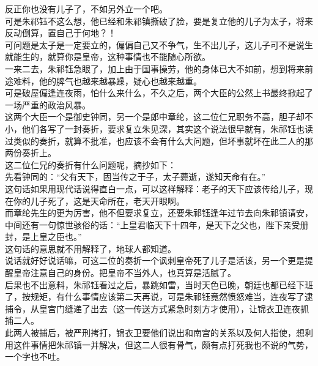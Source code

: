 \begin{multicols}{\theparacolNo}
反正你也没有儿子了，不如另外立一个吧。\\

可是朱祁钰不这么想，他已经和朱祁镇撕破了脸，要是复立他的儿子为太子，将来反动倒算，置自己于何地？！\\

可问题是太子是一定要立的，偏偏自己又不争气，生不出儿子，这儿子可不是说生就能生的，就算你是皇帝，这种事情也不能随心所欲。\\

一来二去，朱祁钰急眼了，加上由于国事操劳，他的身体已大不如前，想到将来前途难料，他的脾气也越来越暴躁，疑心也越来越重。\\

可是破屋偏逢连夜雨，怕什么来什么，不久之后，两个大臣的公然上书最终掀起了一场严重的政治风暴。\\

这两个大臣一个是御史钟同，另一个是郎中章纶，这二位仁兄职务不高，胆子却不小，他们各写了一封奏折，要求复立朱见深，其实这个说法很早就有，朱祁钰也读过类似的奏折，就算不批准，也应该不会有什么大问题，但坏事就坏在此二人的那两份奏折上。\\

这二位仁兄的奏折有什么问题呢，摘抄如下：\\

先看钟同的：“父有天下，固当传之于子，太子薨逝，遂知天命有在。”\\

这句话如果用现代话说得直白一点，可以这样解释：老子的天下应该传给儿子，现在你的儿子死了，这是天命所在，老天开眼啊。\\

而章纶先生的更为厉害，他不但要求复立，还要朱祁钰逢年过节去向朱祁镇请安，中间还有一句惊世骇俗的话：“上皇君临天下十四年，是天下之父也，陛下亲受册封，是上皇之臣也。”\\

这句话的意思就不用解释了，地球人都知道。\\

说话就好好说话嘛，可这二位的奏折一个讽刺皇帝死了儿子是活该，另一个更是提醒皇帝注意自己的身份。把皇帝不当外人，也真算是活腻了。\\

后果也不出意料，朱祁钰看过之后，暴跳如雷，当时天色已晚，朝廷也都已经下班了，按规矩，有什么事情应该第二天再说，可是朱祁钰竟然愤怒难当，连夜写了逮捕令，从皇宫门缝递了出去（这一传送方式紧急时刻方才使用），让锦衣卫连夜抓捕二人。\\

此两人被捕后，被严刑拷打，锦衣卫要他们说出和南宫的关系以及何人指使，想利用这件事情把朱祁镇一并解决，但这二人很有骨气，颇有点打死我也不说的气势，一个字也不吐。\\


\end{multicols}
